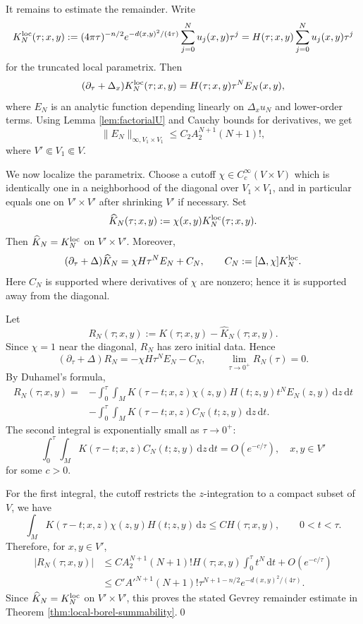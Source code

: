 \documentclass[11pt]{amsart}
\theoremstyle{plain}
\theoremstyle{definition}
\newcommand{\dd}{\mathrm d}
\begin{document}
It remains to estimate the remainder.  Write
\[
K_N^{\rm loc}(\tau;x,y):=(4\pi\tau)^{-n/2}e^{-d(x,y)^2/(4\tau)}\sum_{j=0}^N u_j(x,y)\tau^j
=H(\tau;x,y)\sum_{j=0}^N u_j(x,y)\tau^j
\]
for the truncated local parametrix.  Then
\[
(\partial_\tau+\Delta_x)K_N^{\rm loc}(\tau;x,y)
=H(\tau;x,y)\tau^N E_N(x,y),
\]
where $E_N$ is an analytic function depending linearly on $\Delta_x u_N$ and lower-order terms.  Using Lemma \ref{lem:factorialU} and Cauchy
bounds for derivatives, we get
\[
\|E_N\|_{\infty,V_1\times V_1}\leq C_2 A_2^{N+1}(N+1)!,
\]
where $V'\Subset V_1\Subset V$.

We now localize the parametrix.  Choose a cutoff $\chi\in C_c^\infty(V\times V)$ which is identically one in a neighborhood of the diagonal over
$V_1\times V_1$, and in particular equals one on $V'\times V'$
after shrinking $V'$ if necessary.  Set
\[
\widehat K_N(\tau;x,y):=\chi(x,y)K_N^{\rm loc}(\tau;x,y).
\]
Then $\widehat K_N=K_N^{\rm loc}$ on $V'\times V'$.  Moreover,
\[
(\partial_\tau+\Delta)\widehat K_N=
\chi H\tau^N E_N+C_N,\qquad C_N:=[\Delta,\chi]K_N^{\rm loc}.
\]
Here $C_N$ is supported where derivatives of $\chi$ are nonzero;
hence it is supported away from the diagonal.

Let
\[
R_N(\tau;x,y):=K(\tau;x,y)-\widehat K_N(\tau;x,y).
\]
Since $\chi=1$ near the diagonal, $R_N$ has zero initial data.  Hence
\[
(\partial_\tau+\Delta)R_N=-\chi H\tau^N E_N
-C_N,\qquad\lim_{\tau\to0^+}R_N(\tau)=0 .
\]
By Duhamel's formula,
\[
\begin{aligned}
R_N(\tau;x,y)
=&-\int_0^\tau\int_M
K(\tau-t;x,z)\chi(z,y)H(t;z,y)t^N E_N(z,y)\,\dd z\,\dd t\\[0.1cm]
&-\int_0^\tau\int_MK(\tau-t;x,z)C_N(t;z,y)\,\dd z\,\dd t .
\end{aligned}
\]
The second integral is exponentially small as $\tau\to0^+$: %
\[
\int_0^\tau\int_MK(\tau-t;x,z)C_N(t;z,y)\,\dd z\,\dd t
=O(e^{-c/\tau}),\quad x,y\in V'
\]
for some $c>0$. 

For the first integral, the cutoff restricts the $z$-integration to a
compact subset of $V$, we have
\[
\int_MK(\tau-t;x,z)\chi(z,y)H(t;z,y)\,\dd z
\leq C H(\tau;x,y),\qquad 0<t<\tau .
\]
Therefore, for $x,y\in V'$,
\begin{align*}
|R_N(\tau;x,y)|&\leq C A_2^{N+1}(N+1)!H(\tau;x,y)
\int_0^\tau t^N\,\dd t +O(e^{-c/\tau})\\
&\leq C' A'^{N+1}(N+1)!\tau^{N+1-n/2}e^{-d(x,y)^2/(4\tau)}.
\end{align*}
Since $\widehat K_N=K_N^{\rm loc}$ on $V'\times V'$, this proves the
stated Gevrey remainder estimate in Theorem \ref{thm:local-borel-summability}.\qed
\end{document}
